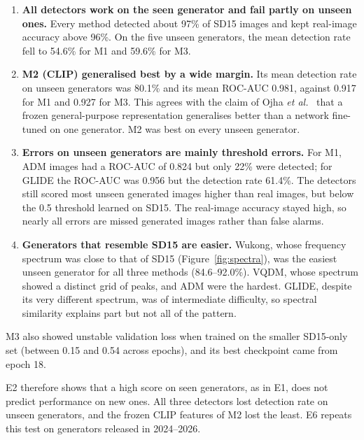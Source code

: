 \documentclass{mnnit}
\begin{document}
\begin{enumerate}
  \item \textbf{All detectors work on the seen generator and fail
        partly on unseen ones.} Every method detected about 97\% of SD15
        images and kept real-image accuracy above 96\%. On the five unseen
        generators, the mean detection rate fell to 54.6\% for M1 and
        59.6\% for M3.
  \item \textbf{M2 (CLIP) generalised best by a wide margin.} Its mean
        detection rate on unseen generators was 80.1\% and its mean
        \mbox{ROC-AUC} 0.981, against 0.917 for M1 and 0.927 for M3. This agrees
        with the claim of Ojha \emph{et al.}~\cite{ojha2023universal} that
        a frozen general-purpose representation generalises better than
        a network fine-tuned on one generator. M2 was best on every unseen
        generator.
  \item \textbf{Errors on unseen generators are mainly threshold errors.}
        For M1, ADM images had a \mbox{ROC-AUC} of 0.824 but only 22\% were
        detected; for GLIDE the \mbox{ROC-AUC} was 0.956 but the detection rate
        61.4\%. The detectors still scored most unseen generated images
        higher than real images, but below the 0.5 threshold learned on
        SD15. The real-image accuracy stayed high, so nearly all errors
        are missed generated images rather than false alarms.
  \item \textbf{Generators that resemble SD15 are easier.} Wukong, whose
        frequency spectrum was close to that of SD15
        (Figure~\ref{fig:spectra}), was the easiest unseen generator for
        all three methods (84.6--92.0\%). VQDM, whose spectrum showed a
        distinct grid of peaks, and ADM were the hardest. GLIDE, despite
        its very different spectrum, was of intermediate difficulty, so
        spectral similarity explains part but not all of the pattern.
\end{enumerate}

M3 also showed unstable validation loss when trained on the smaller
SD15-only set (between 0.15 and 0.54 across epochs), and its best
checkpoint came from epoch 18.

E2 therefore shows that a high score on seen generators, as in E1, does
not predict performance on new ones. All three detectors lost detection
rate on unseen generators, and the frozen CLIP features of M2 lost the
least. E6 repeats this test on generators released in 2024--2026.
\end{document}

